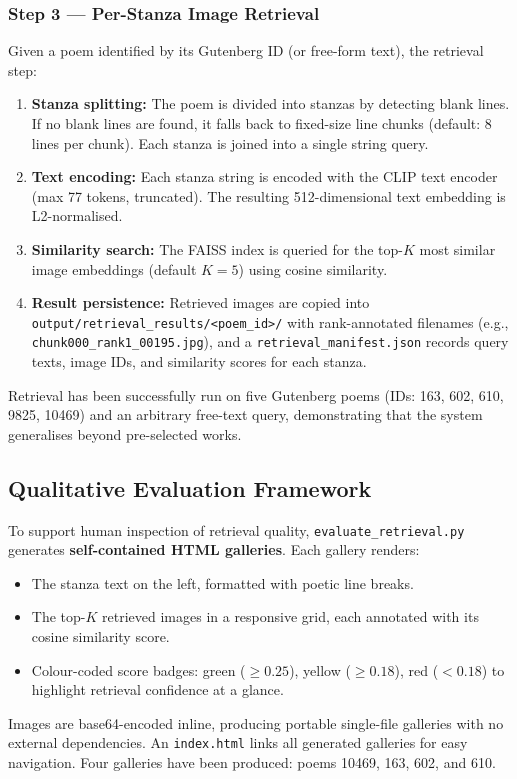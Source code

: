 \documentclass[11pt,a4paper]{article}
\begin{document}
\subsubsection*{Step 3 — Per-Stanza Image Retrieval}

Given a poem identified by its Gutenberg ID (or free-form text), the retrieval step:
\begin{enumerate}
  \item \textbf{Stanza splitting:} The poem is divided into stanzas by detecting blank lines. If no blank lines are found, it falls back to fixed-size line chunks (default: 8 lines per chunk). Each stanza is joined into a single string query.
  \item \textbf{Text encoding:} Each stanza string is encoded with the CLIP text encoder (max 77 tokens, truncated). The resulting 512-dimensional text embedding is L2-normalised.
  \item \textbf{Similarity search:} The FAISS index is queried for the top-$K$ most similar image embeddings (default $K=5$) using cosine similarity.
  \item \textbf{Result persistence:} Retrieved images are copied into \texttt{output/retrieval\_results/<poem\_id>/} with rank-annotated filenames (e.g., \texttt{chunk000\_rank1\_00195.jpg}), and a \texttt{retrieval\_manifest.json} records query texts, image IDs, and similarity scores for each stanza.
\end{enumerate}
Retrieval has been successfully run on five Gutenberg poems (IDs: 163, 602, 610, 9825, 10469) and an arbitrary free-text query, demonstrating that the system generalises beyond pre-selected works.

\subsection*{Qualitative Evaluation Framework}

To support human inspection of retrieval quality, \texttt{evaluate\_retrieval.py} generates \textbf{self-contained HTML galleries}. Each gallery renders:
\begin{itemize}
  \item The stanza text on the left, formatted with poetic line breaks.
  \item The top-$K$ retrieved images in a responsive grid, each annotated with its cosine similarity score.
  \item Colour-coded score badges: green ($\geq 0.25$), yellow ($\geq 0.18$), red ($< 0.18$) to highlight retrieval confidence at a glance.
\end{itemize}
Images are base64-encoded inline, producing portable single-file galleries with no external dependencies. An \texttt{index.html} links all generated galleries for easy navigation. Four galleries have been produced: poems 10469, 163, 602, and 610.
\end{document}

